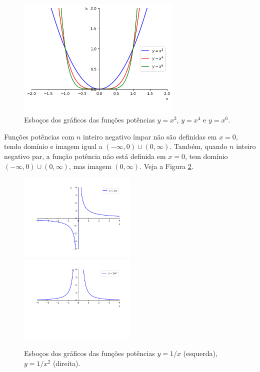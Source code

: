 \begin{figure}[H]
  \centering
  \includegraphics[width=0.7\textwidth]{./cap_funcao/dados/fig_funpot_par/fig_funpot_par}
  \caption{Esboços dos gráficos das funções potências $y=x^2$, $y=x^4$ e $y=x^6$.}
  \label{fig:funpot_par}
\end{figure}

Funções potências com $n$ inteiro negativo ímpar não são definidas em $x=0$, tendo domínio e imagem igual a $(-\infty, 0)\cup (0, \infty)$. Também, quando $n$ inteiro negativo par, a função potência não está definida em $x=0$, tem domínio $(-\infty, 0)\cup (0, \infty)$, mas imagem $(0, \infty)$. Veja a Figura \ref{fig:funpot_negativo}.

\begin{figure}[H]
  \centering
  \includegraphics[width=0.5\textwidth]{./cap_funcao/dados/fig_funpot_negativo/fig_funpot_negativo_impar}~
    \includegraphics[width=0.5\textwidth]{./cap_funcao/dados/fig_funpot_negativo/fig_funpot_negativo_par}
  \caption{Esboços dos gráficos das funções potências $y=1/x$ (esquerda), $y=1/x^2$ (direita).}
  \label{fig:funpot_negativo}
\end{figure}

